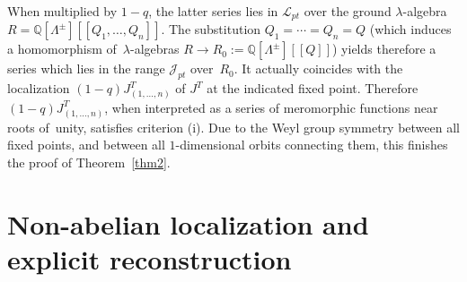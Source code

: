 \documentclass[10pt,a4paper]{amsart}
\numberwithin{equation}{section}
\def\J{\mathcal J}
\def\L{\mathcal L}
\def\QQ{\mathbb Q}
\theoremstyle{definition}
\theoremstyle{plain}
\begin{document}
When multiplied by $1-q$, the latter series lies in $\L_{pt}$ over the ground $\lambda$-algebra $R=\QQ[\Lambda^{\pm}][[Q_1,\dots,Q_n]]$. The substitution $Q_1=\cdots=Q_n=Q$ (which induces a homomorphism of~$\lambda$-algebras $R\to R_0:=\QQ[\Lambda^{\pm}][[Q]]$) yields therefore a series which lies in the range $\J_{pt}$ over~$R_0$. It actually coincides with the localization $(1-q) J^T_{(1,\dots,n)}$ of $J^T$ at the indicated fixed point. Therefore $(1-q) J^T_{(1,\dots,n)}$, when interpreted as a series of meromorphic functions near roots of~unity, satisfies criterion (i). Due to the Weyl group symmetry between all fixed points, and between all $1$-dimensional orbits connecting them, this finishes the proof of Theorem~\ref{thm2}.


\section{Non-abelian localization and explicit reconstruction}
\label{Sec4}
\end{document}
